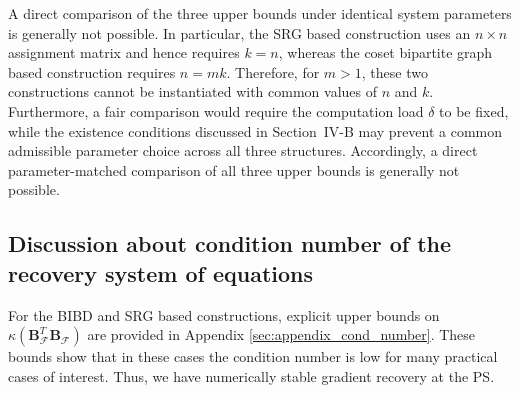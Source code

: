 \documentclass[journal,draftcls,onecolumn]{IEEEtran}
\theoremstyle{mystyle}
\newcommand{\aditya}[1]{\marginpar{+}{\bf Aditya's remark}: {\em #1}}
\newcommand{\sifat}[1]{\marginpar{+}{\bf Sifat's remark}: {\em #1}}
\begin{document}


A direct comparison of the three upper bounds under identical system
parameters is generally not possible. In particular, the SRG based
construction uses an $n\times n$ assignment matrix and hence requires
$k=n$, whereas the coset bipartite graph based construction requires $n=mk$.
Therefore, for $m>1$, these two constructions cannot be instantiated
with common values of $n$ and $k$. Furthermore, a fair comparison would
require the computation load $\delta$ to be fixed, while the existence
conditions discussed in Section~IV-B may prevent a common admissible
parameter choice across all three structures. Accordingly, a direct
parameter-matched comparison of all three upper bounds is generally not
possible.

\subsection{Discussion about condition number of the recovery system of equations}
For the BIBD and SRG based constructions, explicit upper bounds on $\kappa(\mathbf{B}_{\mathcal{F}}^T\mathbf{B}_{\mathcal{F}})$ are provided in Appendix \ref{sec:appendix_cond_number}. These bounds show that in these cases the condition number is low for many practical cases of interest. Thus, we have numerically stable gradient recovery at the PS. 
\end{document}
